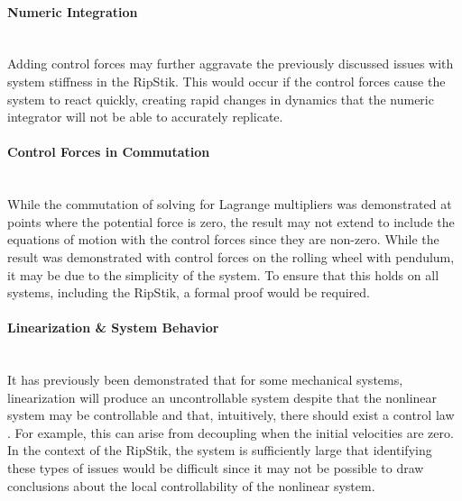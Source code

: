 \paragraph{Numeric Integration}\mbox{}\\
Adding control forces may further aggravate the previously discussed issues with system stiffness in the RipStik. 
This would occur if the control forces cause the system to react quickly, creating rapid changes in dynamics that the numeric integrator will not be able to accurately replicate.
\paragraph{Control Forces in Commutation}\mbox{}\\
While the commutation of solving for Lagrange multipliers was demonstrated \cite{LinNonHolo} at points where the potential force is zero, the result may not extend to include the equations of motion with the control forces since they are non-zero. 
While the result was demonstrated with control forces on the rolling wheel with pendulum, it may be due to the simplicity of the system. 
To ensure that this holds on all systems, including the RipStik, a formal proof would be required.
\paragraph{Linearization \& System Behavior}\mbox{}\\
It has previously been demonstrated that for some mechanical systems, linearization will produce an uncontrollable system despite that the nonlinear system may be controllable and that, intuitively, there should exist a control law \cite{CCSMCS}. 
For example, this can arise from decoupling when the initial velocities are zero. 
In the context of the RipStik, the system is sufficiently large that identifying these types of issues would be difficult since it may not be possible to draw conclusions about the local controllability of the nonlinear system.



